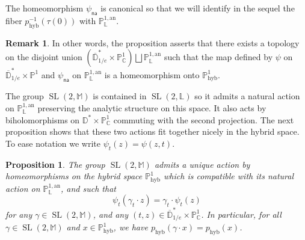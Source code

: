 \documentclass[11pt]{article}
\newtheorem{prop}[theo]{Proposition}
\theoremstyle{definition}
\newtheorem{rema}[theo]{Remark}
\numberwithin{equation}{section}
\numberwithin{figure}{section}
\numberwithin{table}{section}
\DeclareMathOperator{\hyb}{hyb}
\DeclareMathOperator{\SL}{SL}
\newcommand{\cc}{\mathbb{C}}
\newcommand{\phyb}{{\mathbb{P}^1_{\mathrm{hyb}}}}
\newcommand{\mm}{\mathbb{M}}
\newcommand{\D}{\mathbb{D}}
\newcommand{\an}{\mathrm{an}}
\newcommand{\PP}{\mathbb{P}}
\newcommand{\Laurent}{\mathbb{L}}
\newcommand{\lrpar}[1]{\left(#1\right)}
\newcommand{\na}{\mathsf{na}}
\newcommand{\inv}{^{-1}}
\begin{document}
The homeomorphism $\psi_\na$ is canonical so that we will identify in the sequel the fiber $p_{\hyb}\inv(\tau(0))$ with $\PP^{1,\an}_{\Laurent}$.

\begin{rema}
In other words, the proposition asserts that there exists a topology on the disjoint union $\lrpar{\overline{\D}^*_{1/e} \times \PP^1_\cc } \bigsqcup \PP^{1,\an}_{\Laurent}$ such that the map defined by $\psi$ on $\overline{\D}^*_{1/e} \times \PP^1 $ and $\psi_\na$ on $\PP^{1,\an}_{\Laurent}$ is a homeomorphism onto $\phyb$.
\end{rema}

The group $\SL(2,\mm)$ is contained in $\SL(2,\Laurent)$ so it admits a natural action on $\PP^{1,\an}_{\Laurent}$ preserving the analytic structure on this space. It also acts by biholomorphisms on $ \D^*\times \PP^1_\cc $ commuting with the second projection. The next proposition shows that these two actions fit together nicely in the hybrid space. To ease notation we write $\psi_t(z) = \psi(z,t)$.

\begin{prop}\label{prop:action hybrid}
The group $\SL(2,\mm)$ admits a unique action by homeomorphisms on the hybrid space $\PP^1_{\hyb}$ which is compatible with its natural action on $\PP^{1,\an}_{\Laurent}$, and such that
\begin{equation}\label{eq:321}
\psi_t (\gamma_t \cdot z) = \gamma_t \cdot \psi_t(z)
\end{equation}
for any $\gamma\in \SL(2,\mm)$, and any $(t,z)\in \overline{\D}^*_{1/e} \times\PP^1_\cc $. In particular, for all $\gamma\in \SL(2,\mm)$ and $x\in \phyb$, we have $p_{\hyb} (\gamma \cdot x) = p_{\hyb} (x)$.
\end{prop}
\end{document}
